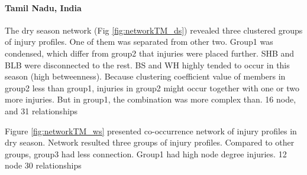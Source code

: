 \paragraph{Tamil Nadu, India}

The dry season network (Fig \ref{fig:networkTM_ds}) revealed three clustered groups of injury profiles. One of them was separated from other two. Group1 was condensed, which differ from group2 that injuries were placed further. SHB and BLB were disconnected to the rest.  BS and WH highly tended to occur in this season (high betweenness).  Because clustering coefficient value of members in group2 less than group1, injuries in group2 might occur together with one or two more injuries. But in group1, the combination was more complex than. 16 node, and 31 relationships

Figure \ref{fig:networkTM_ws} presented co-occurrence network of injury profiles in dry season. Network resulted three groups of injury profiles. Compared to other groups, group3 had less connection. Group1 had high node degree injuries. 12 node 30 relationships


